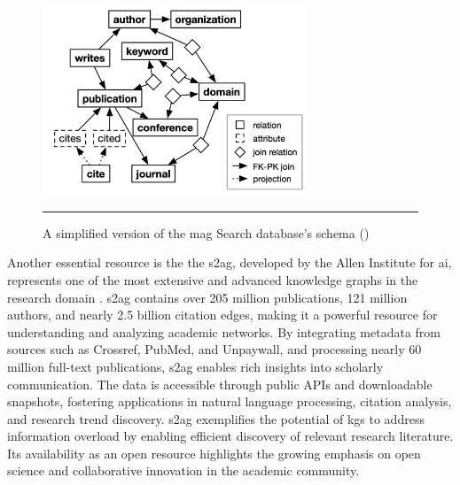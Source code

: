 \begin{figure}[htbp]
    \centering
 \includegraphics[width=0.7\textwidth]{figures/literature-review/mag-schema.png}
     \rule{35em}{0.5pt}
    \caption{A simplified version of the \gls{mag} Search database's schema (\textcite{Baik2019})} 
 \label{fig:mag-schema}
\end{figure}

Another essential resource is the the \gls{s2ag}, developed by the Allen Institute for \acrlong{ai}, represents one of the most extensive and advanced knowledge graphs in the research domain \cite{S2AG}.
\gls{s2ag} contains over 205 million publications, 121 million authors, and nearly 2.5 billion citation edges, making it a powerful resource for understanding and analyzing academic networks.
By integrating metadata from sources such as Crossref, PubMed, and Unpaywall, and processing nearly 60 million full-text publications, \gls{s2ag} enables rich insights into scholarly communication.
The data is accessible through public APIs and downloadable snapshots, fostering applications in natural language processing, citation analysis, and research trend discovery.
\gls{s2ag} exemplifies the potential of \glspl{kg} to address information overload by enabling efficient discovery of relevant research literature.
Its availability as an open resource highlights the growing emphasis on open science and collaborative innovation in the academic community.

